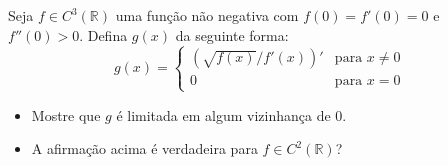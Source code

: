 Seja \(f\in C^3(\mathbb{R})\) uma função não negativa com \(f(0)=f'(0)=0\) e \(f''(0)>0\). Defina \(g(x)\) da seguinte forma:
\[ g(x)= \begin{cases} \left( \sqrt{f(x)}/f'(x) \right)' &\text{para } x\neq 0 \\ 0 &\text{para } x=0 \end{cases} \]
\begin{itemize}
\item[(a)] Mostre que \(g\) é limitada em algum vizinhança de \(0\).
\item[(b)] A afirmação acima é verdadeira para \(f\in C^2(\mathbb{R})\)?
\end{itemize}
